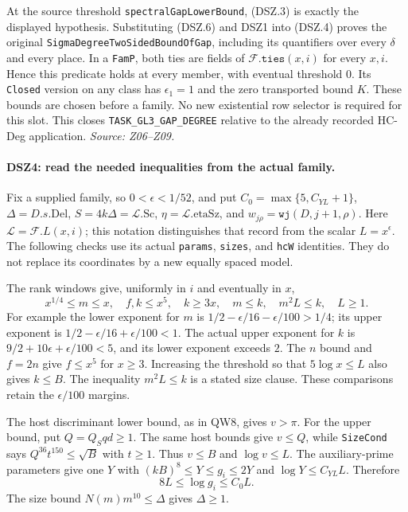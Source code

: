 At the source threshold \texttt{spectralGapLowerBound}, (DSZ.3)
is exactly the displayed hypothesis. Substituting (DSZ.6) and
DSZ1 into (DSZ.4) proves the original
\texttt{SigmaDegreeTwoSidedBoundOfGap}, including its quantifiers
over every $\delta$ and every place. In a \texttt{FamP}, both ties
are fields of $\mathcal F.\texttt{ties}(x,i)$ for every $x,i$.
Hence this predicate holds at every member, with eventual threshold
$0$. Its \texttt{Closed} version on any class has
$\epsilon_1=1$ and the zero transported bound $K$. These bounds
are chosen before a family. No new existential row selector is
required for this slot. This closes \texttt{TASK\_GL3\_GAP\_DEGREE}
relative to the already recorded HC-Deg application.
\emph{Source: Z06--Z09.}

\paragraph{DSZ4: read the needed inequalities from the actual family.}
\label{claim:DSZ4}
Fix a supplied family, so $0<\epsilon<1/52$, and put
$C_0=\max\{5,C_{YL}+1\}$,
$\Delta=D.s.\mathrm{Del}$,
$S=4k\Delta=\mathcal L.\mathrm{Sc}$,
$\eta=\mathcal L.\mathrm{etaSz}$, and
$w_{j\rho}=\texttt{wj}(D,j+1,\rho)$.
Here $\mathcal L=\mathcal F.L(x,i)$; this notation distinguishes
that record from the scalar $L=x^\epsilon$.
The following checks use its actual \texttt{params},
\texttt{sizes}, and \texttt{hcW} identities. They do not replace its
coordinates by a new equally spaced model.

The rank windows give, uniformly in $i$ and eventually in $x$,
\[
 x^{1/4}\le m\le x,\quad f,k\le x^5,\quad k\ge3x,
 \quad m\le k,\quad m^2L\le k,\quad L\ge1.                    \tag{DSZ.7}
\]
For example the lower exponent for $m$ is
$1/2-\epsilon/16-\epsilon/100>1/4$; its upper exponent is
$1/2-\epsilon/16+\epsilon/100<1$. The actual upper exponent for
$k$ is $9/2+10\epsilon+\epsilon/100<5$, and its lower exponent
exceeds $2$. The $n$ bound and $f=2n$ give $f\le x^5$ for
$x\ge3$. Increasing the threshold so that $5\log x\le L$ also
gives $k\le B$. The inequality $m^2L\le k$ is a stated size clause.
These comparisons retain the $\epsilon/100$ margins.

The host discriminant lower bound, as in QW8, gives $v>\pi$.
For the upper bound, put $Q=Q_Sqd\ge1$. The same host bounds
give $v\le Q$, while \texttt{SizeCond} says
$Q^{36}t^{150}\le\sqrt B$ with $t\ge1$.
Thus $v\le B$ and $\log v\le L$.
The auxiliary-prime parameters give one $Y$ with
$(kB)^8\le Y\le g_i\le2Y$ and $\log Y\le C_{YL}L$.
Therefore
\[
                  8L\le\log g_i\le C_0L.                    \tag{DSZ.8}
\]
The size bound $N(m)m^{10}\le\Delta$ gives $\Delta\ge1$.

